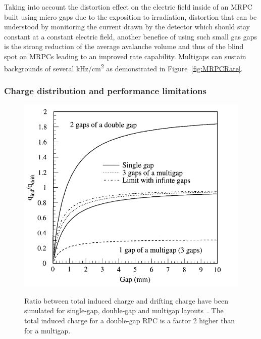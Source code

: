 \endgroup
	
	Taking into account the distortion effect on the electric field inside of an MRPC built using micro gaps due to the exposition to irradiation, distortion that can be understood by monitoring the current drawn by the detector which should stay constant at a constant electric field, another benefice of using such small gas gaps is the strong reduction of the average avalanche volume and thus of the blind spot on MRPCs leading to an improved rate capability. Multigaps can sustain backgrounds of several \si{kHz/cm^2} as demonstrated in Figure~\ref{fig:MRPCRate}.
	
		\subsubsection{Charge distribution and performance limitations}
		\label{chapt3:sssec:charge}
	
\begingroup\setlength{\intextsep}{5pt}\setlength{\columnsep}{15pt}
	
	\begin{figure}
		\centering
		\includegraphics[width = \linewidth]{fig/chapt3/Layout_charge_ratio.png}\\
		\caption{\label{fig:ChargeRatio} Ratio between total induced charge and drifting charge have been simulated for single-gap, double-gap and multigap layouts~\cite{ABBRESCIA99}. The total induced charge for a double-gap RPC is a factor 2 higher than for a multigap.}
	\end{figure}
		
